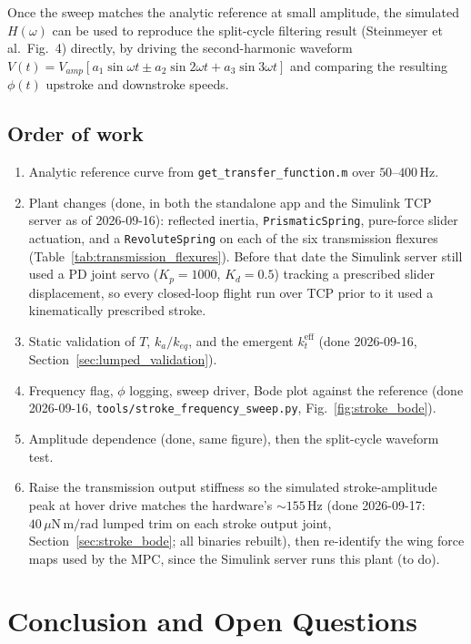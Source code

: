 \documentclass{article}
\begin{document}
Once the sweep matches the analytic reference at small amplitude, the simulated \(H(\omega)\) can be used to reproduce the split-cycle filtering result (Steinmeyer et al.\ Fig.~4) directly, by driving the second-harmonic waveform \(V(t) = V_{amp}[a_1\sin\omega t \pm a_2\sin 2\omega t + a_3 \sin 3\omega t]\) and comparing the resulting \(\phi(t)\) upstroke and downstroke speeds.

\subsection{Order of work}
\begin{enumerate}
    \item Analytic reference curve from \texttt{get\_transfer\_function.m} over \(50\)--\(400\,\mathrm{Hz}\).
    \item Plant changes (done, in both the standalone app and the Simulink TCP server as of 2026-09-16): reflected inertia, \texttt{PrismaticSpring}, pure-force slider actuation, and a \texttt{RevoluteSpring} on each of the six transmission flexures (Table~\ref{tab:transmission_flexures}). Before that date the Simulink server still used a PD joint servo (\(K_p = 1000\), \(K_d = 0.5\)) tracking a prescribed slider displacement, so every closed-loop flight run over TCP prior to it used a kinematically prescribed stroke.
    \item Static validation of \(T\), \(k_a/k_{eq}\), and the emergent \(k_t^{\mathrm{eff}}\) (done 2026-09-16, Section~\ref{sec:lumped_validation}).
    \item Frequency flag, \(\phi\) logging, sweep driver, Bode plot against the reference (done 2026-09-16, \texttt{tools/stroke\_frequency\_sweep.py}, Fig.~\ref{fig:stroke_bode}).
    \item Amplitude dependence (done, same figure), then the split-cycle waveform test.
    \item Raise the transmission output stiffness so the simulated stroke-amplitude peak at hover drive matches the hardware's \(\sim 155\,\mathrm{Hz}\) (done 2026-09-17: \(40\,\mu\mathrm{N\,m/rad}\) lumped trim on each stroke output joint, Section~\ref{sec:stroke_bode}; all binaries rebuilt), then re-identify the wing force maps used by the MPC, since the Simulink server runs this plant (to do).
\end{enumerate}

\section{Conclusion and Open Questions}
\end{document}
